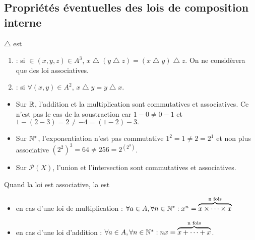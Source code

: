 \documentclass{book}
\begin{document}
\subsection{Propriétés éventuelles des lois de composition interne}
\begin{Definition}
$\bigtriangleup$ est
\begin{enumerate}
\item  {} : si $\in(x,y,z)\in A^3$, $x \bigtriangleup (y \bigtriangleup z) = (x \bigtriangleup y) \bigtriangleup z$.
  On ne considèrera que des loi associatives.
\item
  : si $\forall(x,y)\in A^2$, $x \bigtriangleup y = y \bigtriangleup x$.
 \end{enumerate}
\end{Definition} 
 \begin{Exemple}
\begin{itemize}
\item Sur $\mathbb{R}$, l'addition et la multiplication sont commutatives et associatives. Ce n'est pas le cas de la soustraction car $1-0\neq 0-1$ et $1-(2-3)=2\neq -4= (1-2)-3.$
\item Sur $\mathbb{N}^*$,  l'exponentiation n'est pas commutative $1^2=1\neq 2=2^1$ et non plus associative $\left(2^2\right)^3 = 64\neq 256 =2^{(2^3)}$.
\item Sur  $\mathcal{P}(X)$, l'union et l'intersection sont commutatives et associatives.
\end{itemize}
\end{Exemple}
\begin{Remarque}
Quand la loi est associative, la  est
\begin{itemize}
\item en cas d'une loi de multiplication : $\forall a\in A,\forall n\in\mathbb{N}^*: x^n=\overbrace{x\times \dots \times x }^{\text{n fois}} $
\item en cas d'une loi d'addition : $\forall a\in A,\forall n\in\mathbb{N}^*: nx=\overbrace{x+ \dots + x }^{\text{n fois}} $.
\end{itemize}  
\end{Remarque}
\end{document}
